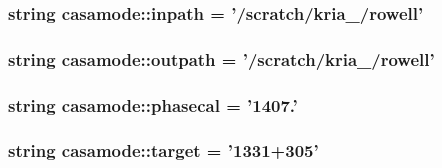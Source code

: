 \hypertarget{namespacecasamode_aecdb6c4b0173d8c6ddaa53340133ac89}{
\subsubsection[{inpath}]{\setlength{\rightskip}{0pt plus 5cm}string {\bf casamode\-::inpath} = '/scratch/kria\-\_/rowell'}}\label{namespacecasamode_aecdb6c4b0173d8c6ddaa53340133ac89}
\hypertarget{namespacecasamode_a4f350c4e696fcd2e2d45a5f6c9cfafb0}{
\subsubsection[{outpath}]{\setlength{\rightskip}{0pt plus 5cm}string {\bf casamode\-::outpath} = '/scratch/kria\-\_/rowell'}}\label{namespacecasamode_a4f350c4e696fcd2e2d45a5f6c9cfafb0}
\hypertarget{namespacecasamode_aecc7de8e7c1db024c5c8d843ecd56927}{
\subsubsection[{phasecal}]{\setlength{\rightskip}{0pt plus 5cm}string {\bf casamode\-::phasecal} = '1407.'}}\label{namespacecasamode_aecc7de8e7c1db024c5c8d843ecd56927}
\hypertarget{namespacecasamode_a14694f46bf2d61abd8fc20ef37d54a71}{
\subsubsection[{target}]{\setlength{\rightskip}{0pt plus 5cm}string {\bf casamode\-::target} = '1331+305'}}\label{namespacecasamode_a14694f46bf2d61abd8fc20ef37d54a71}
